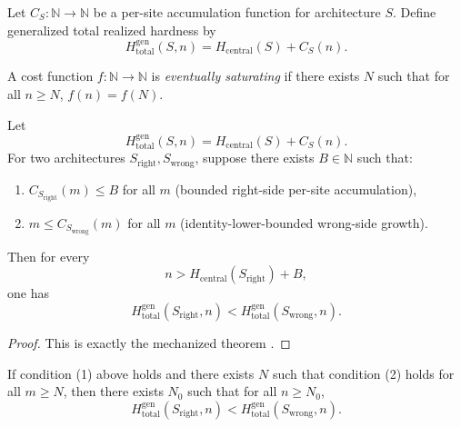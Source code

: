 \begin{definition}\label{def:generalized-site-accumulation}
Let $C_S : \mathbb{N} \to \mathbb{N}$ be a per-site accumulation function for architecture $S$. Define generalized total realized hardness by
\[
H_{\text{total}}^{\mathrm{gen}}(S,n) = H_{\text{central}}(S) + C_S(n).
\]
\end{definition}

\begin{definition}\label{def:eventual-saturation}
A cost function $f : \mathbb{N}\to\mathbb{N}$ is \emph{eventually saturating} if there exists $N$ such that for all $n\ge N$, $f(n)=f(N)$.
\end{definition}

\begin{theorem}\label{thm:generalized-dominance}
Let
\[
H_{\text{total}}^{\mathrm{gen}}(S,n)=H_{\text{central}}(S)+C_S(n).
\]
For two architectures $S_{\mathrm{right}},S_{\mathrm{wrong}}$, suppose there exists $B\in\mathbb{N}$ such that:
\begin{enumerate}
\item $C_{S_{\mathrm{right}}}(m)\le B$ for all $m$ (bounded right-side per-site accumulation),
\item $m \le C_{S_{\mathrm{wrong}}}(m)$ for all $m$ (identity-lower-bounded wrong-side growth).
\end{enumerate}
Then for every
\[
n > H_{\text{central}}(S_{\mathrm{right}})+B,
\]
one has
\[
H_{\text{total}}^{\mathrm{gen}}(S_{\mathrm{right}},n)
<
H_{\text{total}}^{\mathrm{gen}}(S_{\mathrm{wrong}},n).
\]
\end{theorem}

\begin{proof}
This is exactly the mechanized theorem
.
\end{proof}

\begin{corollary}\label{cor:generalized-eventual-dominance}
If condition (1) above holds and there exists $N$ such that condition (2) holds for all $m\ge N$, then there exists $N_0$ such that for all $n\ge N_0$,
\[
H_{\text{total}}^{\mathrm{gen}}(S_{\mathrm{right}},n)
<
H_{\text{total}}^{\mathrm{gen}}(S_{\mathrm{wrong}},n).
\]
\end{corollary}

